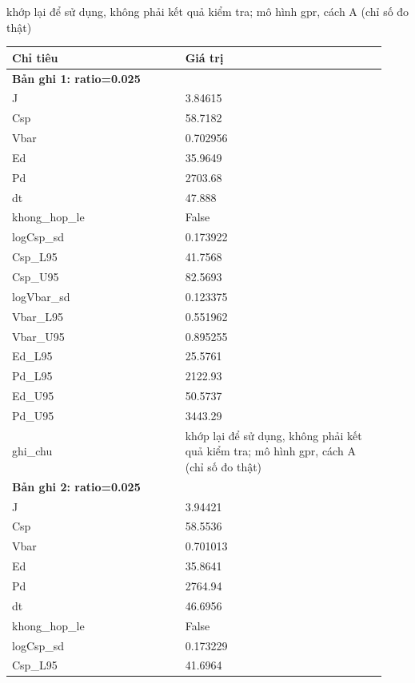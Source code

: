 \par\smallskip\noindent khớp lại để sử dụng, không phải kết quả kiểm tra; mô hình gpr, cách A (chỉ số đo thật)\par
\begin{longtable}{p{0.43\linewidth}p{0.50\linewidth}}
\toprule Chỉ tiêu & Giá trị \\ \midrule \endhead
\multicolumn{2}{p{0.95\linewidth}}{\textbf{Bản ghi 1: ratio=0.025}} \\
J & 3.84615 \\
Csp & 58.7182 \\
Vbar & 0.702956 \\
Ed & 35.9649 \\
Pd & 2703.68 \\
dt & 47.888 \\
khong\_\allowbreak hop\_\allowbreak le & False \\
logCsp\_\allowbreak sd & 0.173922 \\
Csp\_\allowbreak L95 & 41.7568 \\
Csp\_\allowbreak U95 & 82.5693 \\
logVbar\_\allowbreak sd & 0.123375 \\
Vbar\_\allowbreak L95 & 0.551962 \\
Vbar\_\allowbreak U95 & 0.895255 \\
Ed\_\allowbreak L95 & 25.5761 \\
Pd\_\allowbreak L95 & 2122.93 \\
Ed\_\allowbreak U95 & 50.5737 \\
Pd\_\allowbreak U95 & 3443.29 \\
ghi\_\allowbreak chu & khớp lại để sử dụng, không phải kết quả kiểm tra; mô hình gpr, cách A (chỉ số đo thật) \\
\midrule
\multicolumn{2}{p{0.95\linewidth}}{\textbf{Bản ghi 2: ratio=0.025}} \\
J & 3.94421 \\
Csp & 58.5536 \\
Vbar & 0.701013 \\
Ed & 35.8641 \\
Pd & 2764.94 \\
dt & 46.6956 \\
khong\_\allowbreak hop\_\allowbreak le & False \\
logCsp\_\allowbreak sd & 0.173229 \\
Csp\_\allowbreak L95 & 41.6964 \\

\end{longtable}
